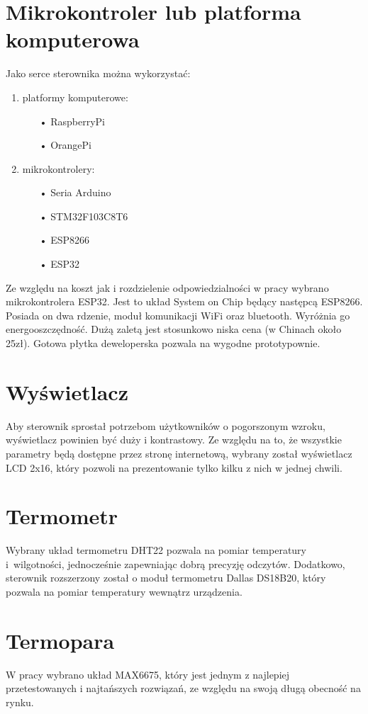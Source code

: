 \documentclass[11pt]{report}
\begin{document}
 \section{Mikrokontroler lub platforma komputerowa}
 Jako serce sterownika można wykorzystać:
 \begin{enumerate}
 \item platformy komputerowe:
 \begin{enumerate}
 \item[•] RaspberryPi
 \item[•] OrangePi
 \end{enumerate}
\item mikrokontrolery:
 \begin{enumerate}
 \item[•] Seria Arduino
 \item[•] STM32F103C8T6
 \item[•] ESP8266
 \item[•] ESP32
 \end{enumerate}
 \end{enumerate}
 Ze względu na koszt jak i rozdzielenie odpowiedzialności w pracy wybrano mikrokontrolera ESP32. Jest to układ System on Chip będący następcą ESP8266. Posiada on dwa rdzenie, moduł komunikacji WiFi oraz bluetooth. Wyróżnia go energooszczędność. Dużą zaletą jest stosunkowo niska cena (w Chinach około 25zł). Gotowa płytka deweloperska pozwala na wygodne prototypownie.
 
 \section{Wyświetlacz}
 Aby sterownik sprostał potrzebom użytkowników o pogorszonym wzroku, wyświetlacz powinien być duży i kontrastowy.
 Ze względu na to, że wszystkie parametry będą dostępne przez stronę internetową, wybrany został wyświetlacz LCD 2x16, który pozwoli na prezentowanie tylko kilku z nich w jednej chwili.
 
 \section{Termometr}
 Wybrany układ termometru DHT22 pozwala na pomiar temperatury i~wilgotności, jednocześnie zapewniając dobrą precyzję odczytów. Dodatkowo, sterownik rozszerzony został o moduł termometru Dallas DS18B20, który pozwala na pomiar temperatury wewnątrz urządzenia.
 
 \section{Termopara}
 W pracy wybrano układ MAX6675, który jest jednym z najlepiej przetestowanych i najtańszych rozwiązań, ze względu na swoją długą obecność na rynku.
 
\end{document}
